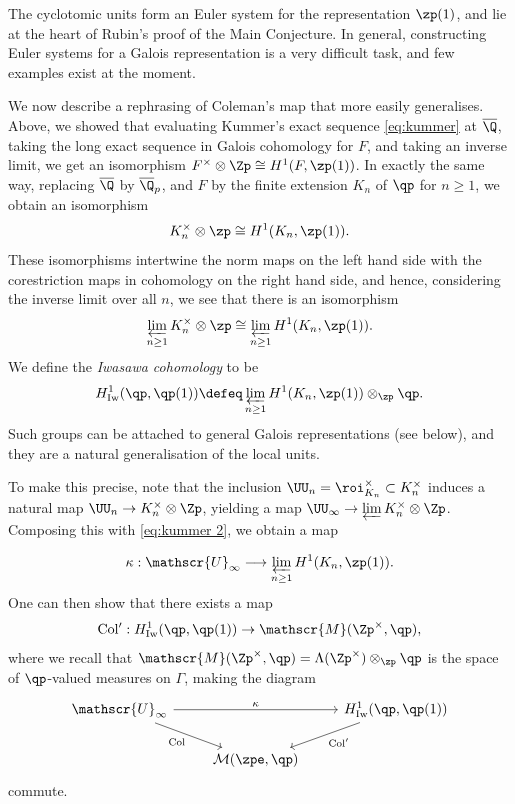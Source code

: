 \documentclass[a4paper,10pt, english, reqno]{smfart}
\newcommand{\GG}{\Gamma}
\numberwithin{equation}{section}
\begin{document}
The cyclotomic units form an Euler system for the representation $\zp(1)$, and lie  at the heart of Rubin's proof of the Main Conjecture. In general, constructing Euler systems for a Galois representation is a very difficult task, and few examples exist at the moment. 


 We now describe a rephrasing of Coleman's map that more easily generalises. Above, we showed that evaluating Kummer's exact sequence \eqref{eq:kummer} at $\overline{\Q}$, taking the long exact sequence in Galois cohomology for $F$, and taking an inverse limit, we get an isomorphism $F^\times \otimes \Zp \cong H^1(F,\zp(1))$. In exactly the same way, replacing $\overline{\Q}$ by $\overline{\Q}_p$, and $F$ by the finite extension $K_n$ of $\qp$ for $n \geq 1$, we obtain an isomorphism
\begin{equation*}
K_n^\times \otimes \zp \cong H^1(K_n, \zp(1)).
\end{equation*}
These isomorphisms intertwine the norm maps on the left hand side with the corestriction maps in cohomology on the right hand side, and hence, considering the inverse limit over all $n$, we see that there is an isomorphism
\begin{equation} \label{eq:kummer 2} \varprojlim_{n \geq 1} K_n^\times \otimes \zp \cong \varprojlim_{n \geq 1} H^1(K_n, \zp(1)).
\end{equation}
We define the \emph{Iwasawa cohomology} to be
\[ H^1_{\rm Iw}(\qp, \qp(1)) \defeq \varprojlim_{n \geq 1} H^1(K_n, \zp(1)) \otimes_{\zp} \qp. \]
Such groups can be attached to general Galois representations (see below), and they are a natural generalisation of the local units. 

To make this precise, note that the inclusion $\UU_n = \roi_{K_n}^\times \subset K_n^\times$ induces a natural map $\UU_n \to K_n^\times \otimes \Zp$, yielding a map $\UU_\infty \to \varprojlim K_n^\times \otimes \Zp$. Composing this with \eqref{eq:kummer 2}, we obtain a map

\[ 
\kappa: \mathscr{U}_\infty \longrightarrow \varprojlim_{n \geq 1} H^1(K_n, \zp(1)). 
\]
One can then show that there exists a map
\[ \mathrm{Col'} : H^1_{\rm Iw}(\qp, \qp(1)) \to \mathscr{M}(\Zp^\times, \qp), \] 
where we recall that $\mathscr{M}(\Zp^\times, \qp) = \Lambda(\Zp^\times) \otimes_{\zp} \qp$ is the space of $\qp$-valued measures on $\GG$, making the diagram
\[
\begin{tikzcd}
\mathscr{U}_\infty \ar[rr, "\kappa"] \ar[rd, "\mathrm{Col}"'] &  & H^1_{\rm Iw}(\qp, \qp(1)) \ar[dl, "\mathrm{Col}'"] \\
& \mathcal{M}(\zpe, \qp) &
\end{tikzcd}
\]
commute. 
\end{document}
